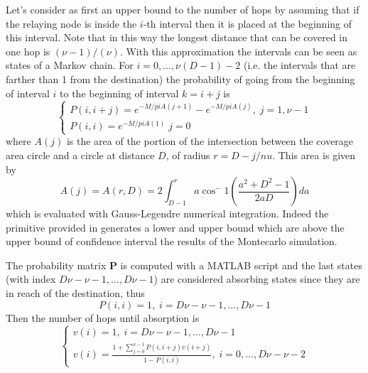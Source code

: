 \documentclass[10pt]{article}
\begin{document}
Let's consider as first an upper bound to the number of hops by assuming that if the relaying node is inside the $i$-th interval then it is placed at the beginning of this interval. Note that in this way the longest distance that can be covered in one hop is $(\nu - 1) / (\nu)$. With this approximation the intervals can be seen as states of a Markov chain. For $i = 0, \dots, \nu (D - 1) - 2$ (i.e. the intervals that are farther than 1 from the destination) the probability of going from the beginning of interval $i$ to the beginning of interval $k = i + j$ is 
\begin{equation}
\begin{cases}
  P(i, i + j) = e^{-M/pi A(j+1)} - e^{-M/pi A(j)}, \; j = 1, \nu-1 \\
  P(i, i) = e^{-M/pi A(1)} \; j = 0
\end{cases}
\end{equation}
where $A(j)$ is the area of the portion of the intersection between the coverage area circle and a circle at distance $D$, of radius $r = D - j/nu$. This area is given by
\begin{equation}
  A(j) = A(r, D) = 2\int_{D-1}^r a \cos^-1 \left( \frac{a^2 + D^2 - 1}{2aD} \right) da
\end{equation}
which is evaluated with Gauss-Legendre numerical integration. Indeed the primitive provided in \cite{tmc} generates a lower and upper bound which are above the upper bound of confidence interval the results of the Montecarlo simulation. 

The probability matrix $\mathbf{P}$ is computed with a MATLAB script and the last states (with index $D\nu - \nu - 1, \dots, D\nu -1 $) are considered absorbing states since they are in reach of the destination, thus
\begin{equation}
  P(i, i) = 1, \; i = D\nu - \nu - 1, \dots, D\nu -1 
\end{equation} 
Then the number of hops until absorption is 
\begin{equation}
\begin{cases}
  v(i) = 1, \; i = D\nu - \nu - 1, \dots, D\nu -1  \\
  v(i) = \frac{1+\sum_{j = 0}^{\nu - 1} P(i, i + j) v(i + j)}{1-P(i, i)}, \; i = 0, \dots, D\nu - \nu - 2
\end{cases}
\end{equation}
\end{document}
